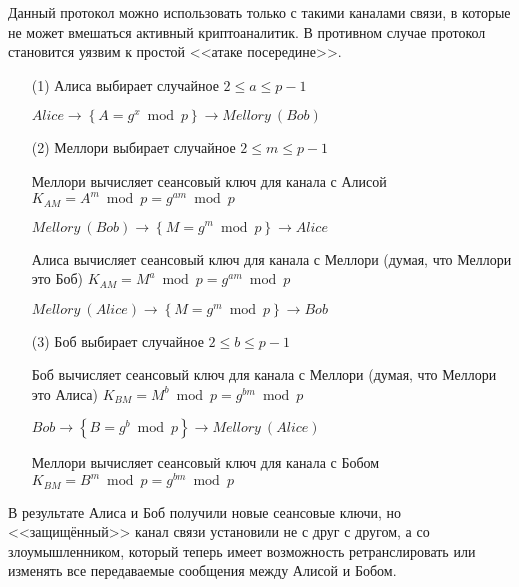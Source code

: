 Данный протокол можно использовать только с такими каналами связи, в которые не может вмешаться активный криптоаналитик. В противном случае протокол становится уязвим к простой <<атаке посередине>>.

\begin{enumerate}
    \item[(1)] Алиса выбирает случайное $2 \leq a \leq p - 1$
    \item[{}] $Alice \to \left\{ A = g ^ x \bmod p \right\} \to Mellory~(Bob)$
    \item[(2)] Меллори выбирает случайное $2 \leq m \leq p-1$
    \item[{}] Меллори вычисляет сеансовый ключ для канала с Алисой $K_{AM} = A ^ m \bmod p = g ^ {am} \bmod p$
    \item[{}] $Mellory~(Bob) \to \left\{ M = g ^ m \bmod p \right\} \to Alice$
    \item[{}] Алиса вычисляет сеансовый ключ для канала с Меллори (думая, что Меллори это Боб) $K_{AM} = M ^ a \bmod p = g ^ { am } \bmod p$
    \item[{}] $Mellory~(Alice) \to \left\{ M = g ^ m \bmod p \right\} \to Bob$
    \item[(3)] Боб выбирает случайное $2 \leq b \leq p-1$
    \item[{}] Боб вычисляет сеансовый ключ для канала с Меллори (думая, что Меллори это Алиса) $K_{BM} = M ^ b \bmod p = g ^ { bm } \bmod p$
    \item[{}] $Bob \to \left\{ B = g ^ b \bmod p \right\} \to Mellory~(Alice)$
    \item[{}] Меллори вычисляет сеансовый ключ для канала с Бобом $K_{BM} = B ^ m \bmod p = g ^ { bm } \bmod p$
\end{enumerate}

В результате Алиса и Боб получили новые сеансовые ключи, но <<защищённый>> канал связи установили не с друг с другом, а со злоумышленником, который теперь имеет возможность ретранслировать или изменять все передаваемые сообщения между Алисой и Бобом.
